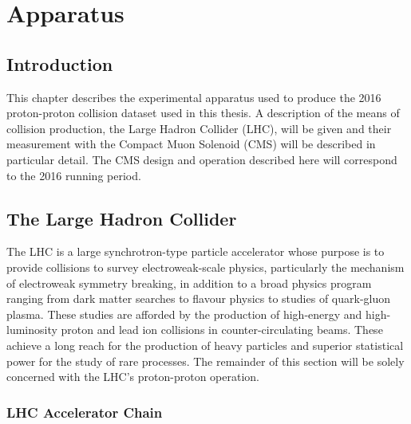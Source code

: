 \chapter{Apparatus}
\label{chap:apparatus}


\newpage

\section{Introduction}
This chapter describes the experimental apparatus used to produce the 2016 proton-proton collision dataset used in this thesis. A description of the means of collision production, the Large Hadron Collider (LHC), will be given and their measurement with the Compact Muon Solenoid (CMS) will be described in particular detail. The CMS design and operation described here will correspond to the 2016 running period.

\section{The Large Hadron Collider}
The LHC \cite{LHC_design_report} is a large synchrotron-type particle accelerator whose purpose is to provide collisions to survey electroweak-scale physics, particularly the mechanism of electroweak symmetry breaking, in addition to a broad physics program ranging from dark matter searches to flavour physics to studies of quark-gluon plasma.
These studies are afforded by the production of high-energy and high-luminosity proton and lead ion collisions in counter-circulating beams. These achieve a long reach for the production of heavy particles and superior statistical power for the study of rare processes. 
The remainder of this section will be solely concerned with the LHC's proton-proton operation.  

\subsection{LHC Accelerator Chain}

